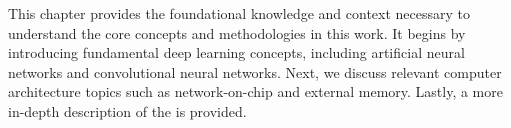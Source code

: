 This chapter provides the foundational knowledge and context necessary to understand the core concepts and methodologies in this work.
It begins by introducing fundamental deep learning concepts, including artificial neural networks and convolutional neural networks.  
Next, we discuss relevant computer architecture topics such as network-on-chip and external memory.
Lastly, a more in-depth description of the \graicore{} is provided.
